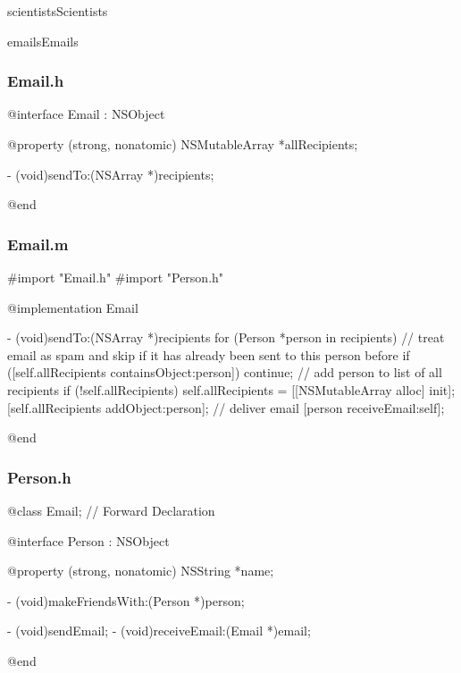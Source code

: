 \documentclass[parskip=half, final]{scrreprt}
\begin{document}
\begin{lsg}
\begin{lsgitem}{scientists}{Scientists}
\begin{enumerate}
\end{enumerate}

\end{lsgitem}


\begin{lsgitem}{emails}{Emails}

\subsubsection{Email.h}
\begin{objclst}
@interface Email : NSObject

@property (strong, nonatomic) NSMutableArray *allRecipients;

- (void)sendTo:(NSArray *)recipients;

@end
\end{objclst}

\subsubsection{Email.m}
\begin{objclst}
#import "Email.h"
#import "Person.h"

@implementation Email

- (void)sendTo:(NSArray *)recipients {
    for (Person *person in recipients) {
        // treat email as spam and skip if it has already been sent to this person before
        if ([self.allRecipients containsObject:person]) continue;
        // add person to list of all recipients
        if (!self.allRecipients) self.allRecipients = [[NSMutableArray alloc] init];
        [self.allRecipients addObject:person];
        // deliver email
        [person receiveEmail:self];
     }
}

@end
\end{objclst}

\subsubsection{Person.h}
\begin{objclst}
@class Email; // Forward Declaration

@interface Person : NSObject

@property (strong, nonatomic) NSString *name;

- (void)makeFriendsWith:(Person *)person;

- (void)sendEmail;
- (void)receiveEmail:(Email *)email;

@end
\end{objclst}


\end{lsgitem}
\end{lsg}
\end{document}

